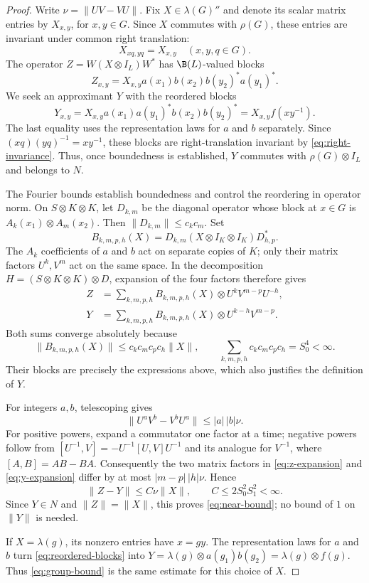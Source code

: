 \begin{proof}
Write $\nu=\|UV-VU\|$. Fix $X\in\lambda(G)''$ and denote its
scalar matrix entries by $X_{x,y}$, for $x,y\in G$. Since $X$
commutes with $\rho(G)$, these entries are invariant under common
right translation:
\begin{equation}\label{eq:right-invariance}
 X_{xq,yq}=X_{x,y}\quad(x,y,q\in G).
\end{equation}
The operator $Z=W(X\otimes I_L)W^*$ has $\B(L)$-valued blocks
\[
 Z_{x,y}=X_{x,y}a(x_1)b(x_2)b(y_2)^*a(y_1)^*.
\]
We seek an approximant $Y$ with the reordered blocks
\begin{equation}\label{eq:reordered-blocks}
 Y_{x,y}=X_{x,y}a(x_1)a(y_1)^*b(x_2)b(y_2)^*
        =X_{x,y}f(xy^{-1}).
\end{equation}
The last equality uses the representation laws for $a$ and $b$
separately. Since $(xq)(yq)^{-1}=xy^{-1}$, these blocks are
right-translation invariant by \eqref{eq:right-invariance}.
Thus, once boundedness is established,
$Y$ commutes with $\rho(G)\otimes I_L$ and belongs to $N$.

The Fourier bounds establish boundedness and control the reordering
in operator norm. On $S\otimes K\otimes K$, let $D_{k,m}$ be
the diagonal operator whose block at $x\in G$ is
$A_k(x_1)\otimes A_m(x_2)$. Then $\|D_{k,m}\|\leq c_kc_m$.
Set
\[
 B_{k,m,p,h}(X)=
 D_{k,m}(X\otimes I_K\otimes I_K)D_{h,p}^*.
\]
The $A_k$ coefficients of $a$ and $b$ act on separate copies of $K$;
only their matrix factors $U^k,V^m$ act on the same space. In the
decomposition $H=(S\otimes K\otimes K)\otimes D$, expansion of the
four factors therefore gives
\begin{align}
 Z&=\sum_{k,m,p,h} B_{k,m,p,h}(X)
                   \otimes U^kV^{m-p}U^{-h},
 \label{eq:z-expansion}\\
 Y&=\sum_{k,m,p,h} B_{k,m,p,h}(X)
                   \otimes U^{k-h}V^{m-p}.
 \label{eq:y-expansion}
\end{align}
Both sums converge absolutely because
\[
 \|B_{k,m,p,h}(X)\|
       \leq c_kc_mc_pc_h\|X\|,
 \qquad \sum_{k,m,p,h}c_kc_mc_pc_h=S_0^4<\infty.
\]
Their blocks are precisely the expressions above, which also
justifies the definition of $Y$.

For integers $a,b$, telescoping gives
\begin{equation}\label{eq:power-commutator}
 \|U^aV^b-V^bU^a\|\leq |a|\,|b|\nu.
\end{equation}
For positive powers, expand a commutator one factor at a time;
negative powers follow from
$[U^{-1},V]=-U^{-1}[U,V]U^{-1}$ and its analogue for $V^{-1}$,
where $[A,B]=AB-BA$. Consequently the two matrix factors in
\eqref{eq:z-expansion} and \eqref{eq:y-expansion} differ by at most
$|m-p|\,|h|\nu$. Hence
\begin{equation}\label{eq:reordering-estimate}
 \|Z-Y\|\leq C\nu\|X\|,
 \qquad C\leq 2S_0^2S_1^2<\infty.
\end{equation}
Since $Y\in N$ and $\|Z\|=\|X\|$, this proves
\eqref{eq:near-bound}; no bound of $1$ on $\|Y\|$ is needed.

If $X=\lambda(g)$, its nonzero entries have $x=gy$. The
representation laws for $a$ and $b$ turn
\eqref{eq:reordered-blocks} into
$Y=\lambda(g)\otimes a(g_1)b(g_2)=\lambda(g)\otimes f(g)$.
Thus \eqref{eq:group-bound} is the same estimate for this choice of $X$.
\end{proof}

